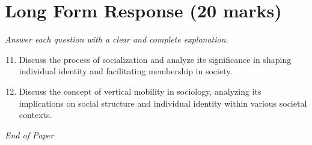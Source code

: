 \documentclass[12pt]{article}
\begin{document}
\section*{Long Form Response (20 marks)}
\textit{Answer each question with a clear and complete explanation.}
\begin{enumerate}[label=\arabic*.]
\setcounter{enumi}{10}
\item Discuss the process of socialization and analyze its significance in shaping individual identity and facilitating membership in society.
\item Discuss the concept of vertical mobility in sociology, analyzing its implications on social structure and individual identity within various societal contexts.
\end{enumerate}

\vfill
\noindent\textit{End of Paper}
\end{document}
